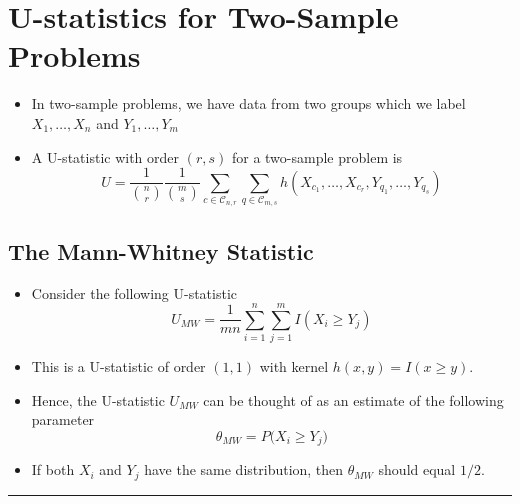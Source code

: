 \documentclass[]{book}
\begin{document}
\hypertarget{u-statistics-for-two-sample-problems}{%
\section{U-statistics for Two-Sample Problems}\label{u-statistics-for-two-sample-problems}}

\begin{itemize}
\item
  In two-sample problems, we have data from two groups which
  we label \(X_{1}, \ldots, X_{n}\) and \(Y_{1}, \ldots, Y_{m}\)
\item
  A U-statistic with order \((r,s)\) for a two-sample problem is
  \begin{equation}
  U = \frac{1}{{n \choose r}}\frac{1}{{m \choose s}} \sum_{c \in \mathcal{C}_{n,r}} \sum_{q \in \mathcal{C}_{m,s}} h(X_{c_{1}}, \ldots, X_{c_{r}}, Y_{q_{1}}, \ldots, Y_{q_{s}})
  \end{equation}
\end{itemize}

\hypertarget{the-mann-whitney-statistic}{%
\subsection{The Mann-Whitney Statistic}\label{the-mann-whitney-statistic}}

\begin{itemize}
\item
  Consider the following U-statistic
  \begin{equation}
  U_{MW} = \frac{1}{mn}\sum_{i=1}^{n}\sum_{j=1}^{m} I( X_{i} \geq Y_{j})
  \end{equation}
\item
  This is a U-statistic of order \((1,1)\) with kernel \(h(x, y) = I(x \geq y)\).
\item
  Hence, the U-statistic \(U_{MW}\) can be thought of as an estimate of the following
  parameter
  \begin{equation}
  \theta_{MW} = P\Big( X_{i} \geq Y_{j} \Big)
  \label{eq:mw-parameter}
  \end{equation}
\item
  If both \(X_{i}\) and \(Y_{j}\) have the same distribution, then
  \(\theta_{MW}\) should equal \(1/2\).
\end{itemize}

\begin{center}\rule{0.5\linewidth}{\linethickness}\end{center}
\end{document}

